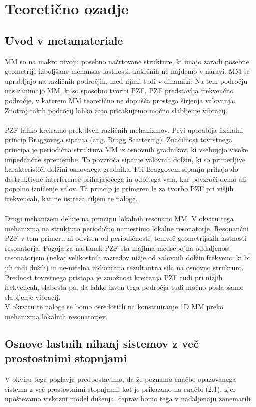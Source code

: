 \documentclass[12pt]{report}
\begin{document}
\chapter{Teoretično ozadje}

\section{Uvod v metamateriale}
\ac{MM} so na makro nivoju posebno načrtovane strukture, ki imajo zaradi posebne geometrije izboljšane
mehanske lastnosti, kakršnih ne najdemo v naravi. \ac{MM} se uprabljajo na različnih področjih,
med njimi tudi v dinamiki. Na tem področju nas zanimajo \ac{MM}, ki so sposobni tvoriti \ac{PZF}. \ac{PZF} 
predstavlja frekvenčno področje, v katerem \ac{MM} teoretično ne dopušča prostega širjenja valovanja.
Znotraj takih področij lahko zato pričakujemo močno slabljenje vibracij.
\\
\\
\ac{PZF} lahko kreiramo prek dveh različnih mehanizmov. Prvi uporablja fizikalni princip Braggovega sipanja
 (ang. Bragg Scattering). Značilnost tovrstnega principa je periodična struktura \ac{MM} iz osnovnih gradnikov,
 ki vsebujejo visoke impedančne spremembe. To povzroča sipanje valovnih dolžin, ki so primerljive karakterističi dolžini 
 osnovnega gradnika. Pri Braggovem sipanju prihaja do destruktivne interference prihajajočega in odbitega vala, kar povzroči
 delno ali popolno izničenje valov. Ta princip je primeren le za tvorbo \ac{PZF} pri višjih frekvencah, kar ne ustreza
 ciljem te naloge.
 \\
 \\
 Drugi mehanizem deluje na principu lokalnih resonanc \ac{MM}. V okviru tega mehanizma na strukturo periodično namestimo
 lokalne resonatorje. Resonančni \ac{PZF} v tem primeru ni odvisen od periodičnosti, temveč geometrijskih lastnosti resonatorja. 
 Pogoja za nastanek \ac{PZF} sta majhna medsebojna oddaljenost resonatorjem (nekaj velikostnih razredov nižje od valovnih dolžin frekvenc,
 ki bi jih radi dušili) in ne-ničelna inducirana rezultantna sila na osnovno strukturo. Prednost tovrstnega pristopa je zmožnost kreiranja
 \ac{PZF} tudi pri nižjih frekvencah, slabosta pa, da lahko izven tega področja tudi močno poslabšamo slabljenje vibracij. \cite{kosir}
 \\
V okrviru te naloge se bomo osredotičli na konstruiranje 1D \ac{MM} preko mehanizma lokalnih resonatorjev.

\section{Osnove lastnih nihanj sistemov z več prostostnimi stopnjami}
V okviru tega poglavja predpostavimo, da že poznamo enačbe opazovanega sistema z več prostostnimi stopnjami, kot je 
prikazano na enačbi (2.1), kjer upoštevamo viskozni model dušenja, čeprav bomo tega v nadaljenaju zanemarili.
\end{document}

